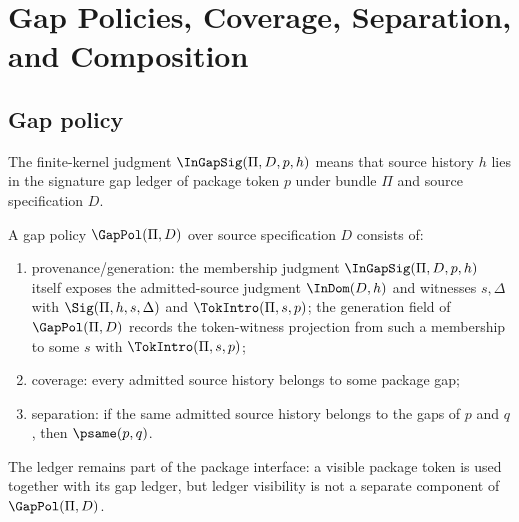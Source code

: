 \chapter{Gap Policies, Coverage, Separation, and Composition}
\label{ch:core-gap-policies-coverage-separation-and-composition}

\section{Gap policy}

\begin{definition}
The finite-kernel judgment $\InGapSig(\Pi,D,p,h)$ means that source history $h$ lies in the signature gap ledger of package token $p$ under bundle $\Pi$ and source specification $D$.
\end{definition}

\begin{definition}
\label{def:gap-policy}
\label{def:gap-policy-interface}
\label{def:gap-policy-generation}
A gap policy $\GapPol(\Pi,D)$ over source specification $D$ consists of:
\begin{enumerate}
  \item provenance/generation: the membership judgment $\InGapSig(\Pi,D,p,h)$ itself exposes the admitted-source judgment $\InDom(D,h)$ and witnesses $s,\Delta$ with $\Sig(\Pi,h,s,\Delta)$ and $\TokIntro(\Pi,s,p)$; the generation field of $\GapPol(\Pi,D)$ records the token-witness projection from such a membership to some $s$ with $\TokIntro(\Pi,s,p)$;
  \item coverage: every admitted source history belongs to some package gap;
  \item separation: if the same admitted source history belongs to the gaps of $p$ and $q$, then $\psame(p,q)$.
\end{enumerate}
The ledger remains part of the package interface: a visible package token is used together with its gap ledger, but ledger visibility is not a separate component of $\GapPol(\Pi,D)$.
\end{definition}

